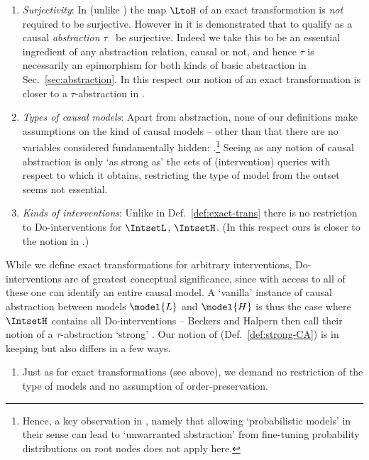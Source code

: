 \documentclass{article}
\begin{document}
{\begin{remark}
\begin{enumerate}
		\item \emph{Surjectivity}: In \cite{rubenstein2017causal, BeckersEtAl_2019_AbstractingCausalModles} (unlike \cite{geiger2023causal}) the map $\LtoH$ of an exact transformation is \emph{not} required to be surjective. However in 
		 \cite{BeckersEtAl_2019_AbstractingCausalModles} it is demonstrated that to qualify as a causal \emph{abstraction}  $\tau$ \ be surjective. 
		 Indeed we take this to be an essential ingredient of any abstraction relation, causal or not, and hence $\tau$ is necessarily an epimorphism for both kinds of basic abstraction in Sec.~\ref{sec:abstraction}. 
		In this respect our notion of an exact transformation is closer to a $\tau$-abstraction in \cite{BeckersEtAl_2019_AbstractingCausalModles}. 		
		
		\item \emph{Types of causal models}: 
		Apart from \CF{} abstraction, none of our definitions make assumptions on the kind of causal models -- other than that there are no variables considered fundamentally hidden: 
		.\footnote{Hence, a key observation in \cite{BeckersEtAl_2019_AbstractingCausalModles}, namely that allowing `probabilistic models' in their sense can lead to `unwarranted abstraction' from fine-tuning probability distributions on root nodes does not apply here.} 		
		Seeing as any notion of causal abstraction is only `as strong as' the sets of (intervention) queries with respect to which it obtains, restricting the type of model from the outset seems not essential. 
		
		\item \emph{Kinds of interventions}: Unlike \cite{rubenstein2017causal, BeckersEtAl_2019_AbstractingCausalModles} in Def.~\ref{def:exact-trans} there is no restriction to Do-interventions for $\IntsetL$, $\IntsetH$. (In this respect ours is closer to the notion in \cite{geiger2023causal}.) 						
	\end{enumerate}
\end{remark}
	
	
\begin{remark} \label{rmk:strong-CA}
	While we define exact transformations for arbitrary interventions, Do-interventions are of greatest conceptual significance, since with access to all of these one can identify an entire causal model. A `vanilla' instance of causal abstraction between models $\model{L}$ and $\model{H}$ is thus the case where $\IntsetH$ contains all Do-interventions 
	-- Beckers and Halpern then call their notion of a $\tau$-abstraction `strong' \cite{BeckersEtAl_2019_AbstractingCausalModles}. 
	Our notion of \emph{\strongCA} (Def.~\ref{def:strong-CA}) is in keeping but also differs in a few ways. 
	\begin{enumerate}
		\item Just as for 
		exact transformations (see above), we demand no restriction of the type of models and no assumption of order-preservation.


\end{enumerate}
\end{remark}}
\end{document}
